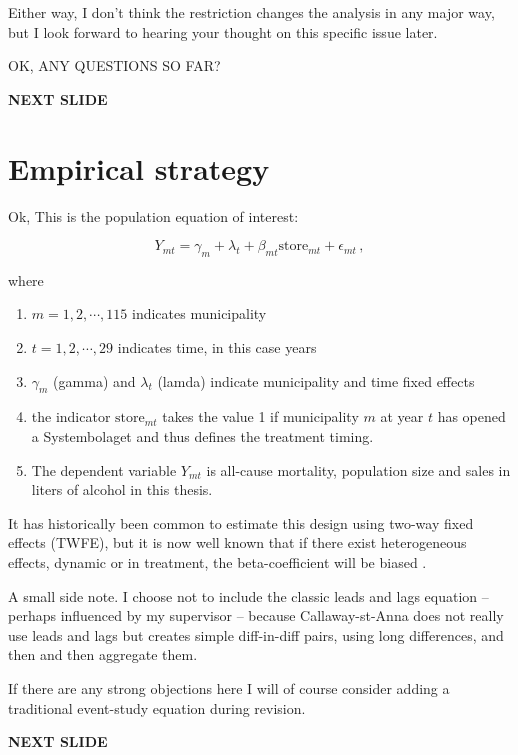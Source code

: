 \documentclass[12pt]{article}
\begin{document}
Either way, I don't think the restriction changes the analysis in any major way, but I look forward to hearing your thought on this specific issue later.


OK, ANY QUESTIONS SO FAR?

 \textbf{NEXT SLIDE}

 \section{Empirical strategy}

 Ok, This is the population equation of interest:

\begin{equation}
    Y_{mt} = \gamma_m + \lambda_t + \beta_{mt}  \text{store}_{mt} + \epsilon_{mt}\, ,
    \label{eq:pop-eq-of-interest}
\end{equation}

where 
\begin{enumerate}
    \item $m = 1,2,\cdots, 115$ indicates municipality
    \item $t = 1,2, \cdots, 29$ indicates time, in this case years
    \item $\gamma_m$ (gamma) and $\lambda_t$ (lamda) indicate municipality and time fixed effects
    \item the indicator $\text{store}_{mt}$ takes the value 1 if municipality $m$ at year $t$ has opened a Systembolaget and thus defines the treatment timing.
    \item The dependent variable $Y_{mt}$ is all-cause mortality, population size and sales in liters of alcohol in this thesis.
\end{enumerate}


It has historically been common to estimate this design using two-way fixed effects (TWFE), but it is now well known that if there exist heterogeneous effects, dynamic or in treatment, the beta-coefficient will be biased \parencite{roth2023a}.

A small side note. I choose not to include the classic leads and lags equation -- perhaps influenced by my supervisor -- because Callaway-st-Anna does not really use leads and lags but creates simple diff-in-diff pairs, using long differences, and then and then aggregate them. 

If there are any strong objections here I will of course consider adding a traditional event-study equation during revision. 

 \textbf{NEXT SLIDE}
\end{document}
